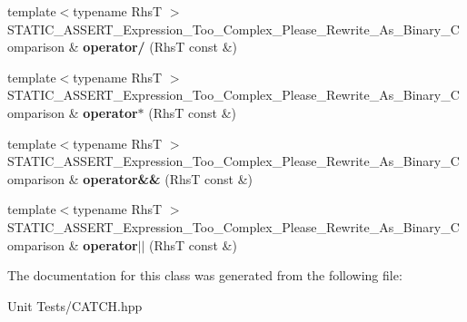 \begin{DoxyCompactItemize}
\item 
{\footnotesize template$<$typename RhsT $>$ }\\S\+T\+A\+T\+I\+C\+\_\+\+A\+S\+S\+E\+R\+T\+\_\+\+Expression\+\_\+\+Too\+\_\+\+Complex\+\_\+\+Please\+\_\+\+Rewrite\+\_\+\+As\+\_\+\+Binary\+\_\+\+Comparison \& {\bfseries operator/} (RhsT const \&)\hypertarget{classCatch_1_1ExpressionLhs_a37d50565046ac9b1c9159a7c0cf88a1e}{}\label{classCatch_1_1ExpressionLhs_a37d50565046ac9b1c9159a7c0cf88a1e}

\item 
{\footnotesize template$<$typename RhsT $>$ }\\S\+T\+A\+T\+I\+C\+\_\+\+A\+S\+S\+E\+R\+T\+\_\+\+Expression\+\_\+\+Too\+\_\+\+Complex\+\_\+\+Please\+\_\+\+Rewrite\+\_\+\+As\+\_\+\+Binary\+\_\+\+Comparison \& {\bfseries operator$\ast$} (RhsT const \&)\hypertarget{classCatch_1_1ExpressionLhs_a9a94294c22449f62087862ef911e6291}{}\label{classCatch_1_1ExpressionLhs_a9a94294c22449f62087862ef911e6291}

\item 
{\footnotesize template$<$typename RhsT $>$ }\\S\+T\+A\+T\+I\+C\+\_\+\+A\+S\+S\+E\+R\+T\+\_\+\+Expression\+\_\+\+Too\+\_\+\+Complex\+\_\+\+Please\+\_\+\+Rewrite\+\_\+\+As\+\_\+\+Binary\+\_\+\+Comparison \& {\bfseries operator\&\&} (RhsT const \&)\hypertarget{classCatch_1_1ExpressionLhs_a7f022056ef4f25e716ab85846be6229f}{}\label{classCatch_1_1ExpressionLhs_a7f022056ef4f25e716ab85846be6229f}

\item 
{\footnotesize template$<$typename RhsT $>$ }\\S\+T\+A\+T\+I\+C\+\_\+\+A\+S\+S\+E\+R\+T\+\_\+\+Expression\+\_\+\+Too\+\_\+\+Complex\+\_\+\+Please\+\_\+\+Rewrite\+\_\+\+As\+\_\+\+Binary\+\_\+\+Comparison \& {\bfseries operator$\vert$$\vert$} (RhsT const \&)\hypertarget{classCatch_1_1ExpressionLhs_a6932b72da79d6c6b03d867772ceac61b}{}\label{classCatch_1_1ExpressionLhs_a6932b72da79d6c6b03d867772ceac61b}

\end{DoxyCompactItemize}


The documentation for this class was generated from the following file\+:\begin{DoxyCompactItemize}
\item 
Unit Tests/C\+A\+T\+C\+H.\+hpp\end{DoxyCompactItemize}
